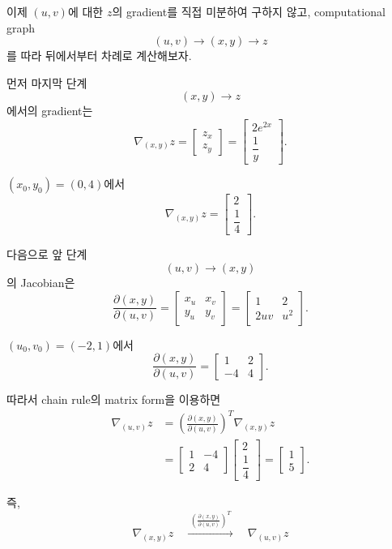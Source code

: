 \documentclass[11pt,a4paper]{article}
\begin{document}
이제 $(u,v)$에 대한 $z$의 gradient를 직접 미분하여 구하지 않고,
computational graph
\[
(u,v)\longrightarrow(x,y)\longrightarrow z
\]
를 따라 뒤에서부터 차례로 계산해보자.

먼저 마지막 단계
\[
(x,y)\longrightarrow z
\]
에서의 gradient는
\[
\nabla_{(x,y)}z
=
\begin{bmatrix}
z_x\\
z_y
\end{bmatrix}
=
\begin{bmatrix}
2e^{2x}\\[0.4em]
\dfrac{1}{y}
\end{bmatrix}.
\]

$(x_0,y_0)=(0,4)$에서
\[
\nabla_{(x,y)}z
=
\begin{bmatrix}
2\\[0.3em]
\dfrac14
\end{bmatrix}.
\]

다음으로 앞 단계
\[
(u,v)\longrightarrow(x,y)
\]
의 Jacobian은
\[
\frac{\partial(x,y)}{\partial(u,v)}
=
\begin{bmatrix}
x_u & x_v\\
y_u & y_v
\end{bmatrix}
=
\begin{bmatrix}
1 & 2\\
2uv & u^2
\end{bmatrix}.
\]

$(u_0,v_0)=(-2,1)$에서
\[
\frac{\partial(x,y)}{\partial(u,v)}
=
\begin{bmatrix}
1 & 2\\
-4 & 4
\end{bmatrix}.
\]

따라서 chain rule의 matrix form을 이용하면
\[
\begin{aligned}
\nabla_{(u,v)}z
&=
\left(
\frac{\partial(x,y)}{\partial(u,v)}
\right)^T
\nabla_{(x,y)}z
\\
&=
\begin{bmatrix}
1 & -4\\
2 & 4
\end{bmatrix}
\begin{bmatrix}
2\\[0.3em]
\dfrac14
\end{bmatrix}
=
\begin{bmatrix}
1\\
5
\end{bmatrix}.
\end{aligned}
\]

즉,
\[
\boxed{
\nabla_{(x,y)}z
\quad\xrightarrow{\;
\left(\frac{\partial(x,y)}{\partial(u,v)}\right)^T
\;}
\quad
\nabla_{(u,v)}z
}
\]
\end{document}
